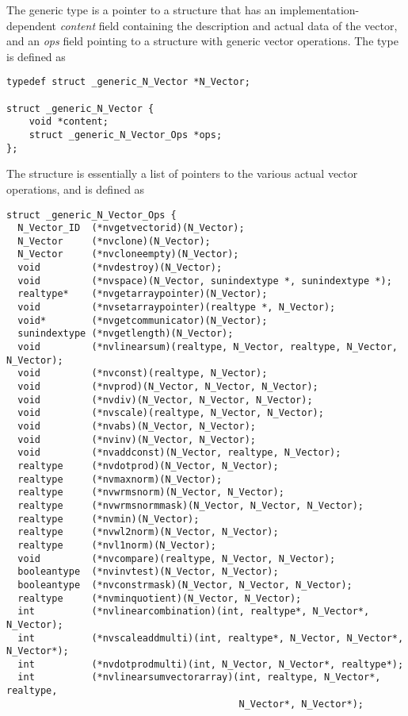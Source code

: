 The generic  type is a pointer to a structure that has an
implementation-dependent {\em content} field containing the
description and actual data of the vector, and an {\em ops} field
pointing to a structure with generic vector operations.
The type  is defined as
\begin{verbatim}
typedef struct _generic_N_Vector *N_Vector;

struct _generic_N_Vector {
    void *content;
    struct _generic_N_Vector_Ops *ops;
};
\end{verbatim}
The  structure is essentially a list of pointers to
the various actual vector operations, and is defined as
\begin{verbatim}
struct _generic_N_Vector_Ops {
  N_Vector_ID  (*nvgetvectorid)(N_Vector);
  N_Vector     (*nvclone)(N_Vector);
  N_Vector     (*nvcloneempty)(N_Vector);
  void         (*nvdestroy)(N_Vector);
  void         (*nvspace)(N_Vector, sunindextype *, sunindextype *);
  realtype*    (*nvgetarraypointer)(N_Vector);
  void         (*nvsetarraypointer)(realtype *, N_Vector);
  void*        (*nvgetcommunicator)(N_Vector);
  sunindextype (*nvgetlength)(N_Vector);
  void         (*nvlinearsum)(realtype, N_Vector, realtype, N_Vector, N_Vector);
  void         (*nvconst)(realtype, N_Vector);
  void         (*nvprod)(N_Vector, N_Vector, N_Vector);
  void         (*nvdiv)(N_Vector, N_Vector, N_Vector);
  void         (*nvscale)(realtype, N_Vector, N_Vector);
  void         (*nvabs)(N_Vector, N_Vector);
  void         (*nvinv)(N_Vector, N_Vector);
  void         (*nvaddconst)(N_Vector, realtype, N_Vector);
  realtype     (*nvdotprod)(N_Vector, N_Vector);
  realtype     (*nvmaxnorm)(N_Vector);
  realtype     (*nvwrmsnorm)(N_Vector, N_Vector);
  realtype     (*nvwrmsnormmask)(N_Vector, N_Vector, N_Vector);
  realtype     (*nvmin)(N_Vector);
  realtype     (*nvwl2norm)(N_Vector, N_Vector);
  realtype     (*nvl1norm)(N_Vector);
  void         (*nvcompare)(realtype, N_Vector, N_Vector);
  booleantype  (*nvinvtest)(N_Vector, N_Vector);
  booleantype  (*nvconstrmask)(N_Vector, N_Vector, N_Vector);
  realtype     (*nvminquotient)(N_Vector, N_Vector);
  int          (*nvlinearcombination)(int, realtype*, N_Vector*, N_Vector);
  int          (*nvscaleaddmulti)(int, realtype*, N_Vector, N_Vector*, N_Vector*);
  int          (*nvdotprodmulti)(int, N_Vector, N_Vector*, realtype*);
  int          (*nvlinearsumvectorarray)(int, realtype, N_Vector*, realtype,
                                         N_Vector*, N_Vector*);

\end{verbatim}
